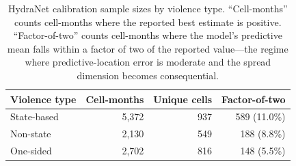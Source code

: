 \begin{table}[h]
    \centering
    \small
    \begin{tabular}{lrrr}
        \toprule
        Violence type & Cell-months & Unique cells & Factor-of-two \\
        \midrule
        State-based & 5{,}372 & 937 & 589 (11.0\%) \\
        Non-state & 2{,}130 & 549 & 188 (8.8\%) \\
        One-sided & 2{,}702 & 816 & 148 (5.5\%) \\
        \bottomrule
    \end{tabular}
    \caption{HydraNet calibration sample sizes by violence type. ``Cell-months'' counts cell-months where the reported best estimate is positive. ``Factor-of-two'' counts cell-months where the model's predictive mean falls within a factor of two of the reported value---the regime where predictive-location error is moderate and the spread dimension becomes consequential.}
    \label{tab:hydranet_sample}
\end{table}
